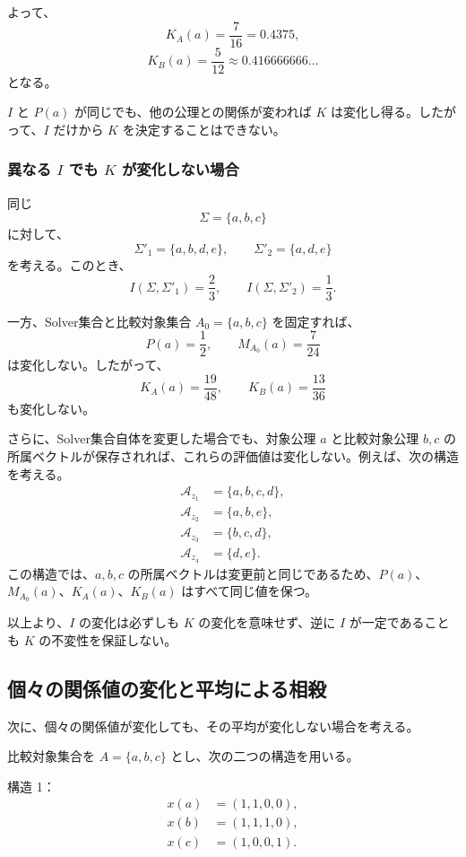 \documentclass[a4paper,11pt]{ltjsarticle}
\begin{document}
よって、
\[
K_A(a)=\frac7{16}=0.4375,
\]
\[
K_B(a)=\frac5{12}
\approx 0.416666666\ldots
\]
となる。

$I$ と $P(a)$ が同じでも、他の公理との関係が変われば $K$ は変化し得る。したがって、$I$ だけから $K$ を決定することはできない。

\subsubsection{異なる $I$ でも $K$ が変化しない場合}

同じ
\[
\Sigma=\{a,b,c\}
\]
に対して、
\[
\Sigma'_1=\{a,b,d,e\},\qquad
\Sigma'_2=\{a,d,e\}
\]
を考える。このとき、
\[
I(\Sigma,\Sigma'_1)=\frac23,\qquad
I(\Sigma,\Sigma'_2)=\frac13.
\]

一方、Solver集合と比較対象集合 $A_0=\{a,b,c\}$ を固定すれば、
\[
P(a)=\frac12,\qquad
M_{A_0}(a)=\frac7{24}
\]
は変化しない。したがって、
\[
K_A(a)=\frac{19}{48},\qquad
K_B(a)=\frac{13}{36}
\]
も変化しない。

さらに、Solver集合自体を変更した場合でも、対象公理 $a$ と比較対象公理 $b,c$ の所属ベクトルが保存されれば、これらの評価値は変化しない。例えば、次の構造を考える。
\[
\begin{aligned}
\mathcal{A}_{z_1}&=\{a,b,c,d\},\\
\mathcal{A}_{z_2}&=\{a,b,e\},\\
\mathcal{A}_{z_3}&=\{b,c,d\},\\
\mathcal{A}_{z_4}&=\{d,e\}.
\end{aligned}
\]
この構造では、$a,b,c$ の所属ベクトルは変更前と同じであるため、$P(a)$、$M_{A_0}(a)$、$K_A(a)$、$K_B(a)$ はすべて同じ値を保つ。

以上より、$I$ の変化は必ずしも $K$ の変化を意味せず、逆に $I$ が一定であることも $K$ の不変性を保証しない。

\subsection{個々の関係値の変化と平均による相殺}

次に、個々の関係値が変化しても、その平均が変化しない場合を考える。

比較対象集合を $A=\{a,b,c\}$ とし、次の二つの構造を用いる。

構造 1：
\[
\begin{aligned}
x(a)&=(1,1,0,0),\\
x(b)&=(1,1,1,0),\\
x(c)&=(1,0,0,1).
\end{aligned}
\]
\end{document}
